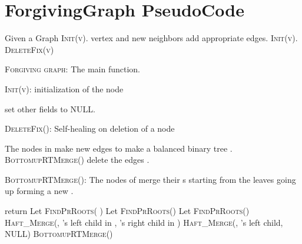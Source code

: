 \documentclass[11pt, letter]{article}
\begin{document}
\pagebreak
\newpage
 


\pagebreak
\appendix

\section{ForgivingGraph PseudoCode}

\begin{algorithm}[h!]
\begin{algorithmic}[1]
\STATE Given a Graph 
\STATE \textsc{Init(v)}.
\ENDFOR
{}
\STATE vertex  and new neighbors add appropriate edges.
\STATE \textsc{Init(v)}.
\STATE \textsc{DeleteFix(v)}
\ENDIF
\ENDWHILE
\end{algorithmic}
\caption{\textsc{Forgiving graph}: The main function.}
\label{algo: forgiving}
\end{algorithm}



 \begin{algorithm}[h!]
 \caption{\textsc{Init(v)}: initialization of the node } 
\label{algo: init}
\begin{algorithmic}[1]
\STATE 
\STATE set other fields to NULL.
\ENDFOR
\end{algorithmic}
\end{algorithm}

\begin{algorithm}[h!]
\caption{\textsc{DeleteFix()}: Self-healing on deletion of a node }
\label{algo: fixnode}
\begin{algorithmic}[1]
\STATE 
{}
\IF{}
\STATE 
\ENDIF
\STATE 
\ENDFOR
\STATE \label{algoline: BTquickfix} The nodes in  make new edges to make a balanced binary tree .
\STATE \textsc{BottomupRTMerge()}
\STATE delete the edges .
\end{algorithmic}
\end{algorithm}




\begin{algorithm}[ph!]
\caption{\textsc{BottomupRTMerge()}: The nodes of  merge  their s starting from the leaves going
up forming a new . }
\label{algo: bottomupmerge}
\begin{algorithmic}[1]
\STATE return
\ENDIF
\FOR{}\label{algoline: findprroots}
 \STATE Let 
 \ELSIF{}
 \STATE \textsc{FindPrRoots( )}
  \STATE Let  \textsc{FindPrRoots()}
  \ELSE
  \STATE  Let  \textsc{FindPrRoots()}
  \ENDIF
\ENDFOR
{}
\STATE \textsc{Haft\_Merge}(,  's left child in ,  's right child in )
\ELSE
\STATE \textsc{Haft\_Merge}(, 's left child, NULL)
\ENDIF
\ENDFOR
\STATE \textsc{BottomupRTMerge()} 
\end{algorithmic}
\end{algorithm}
\end{document}
